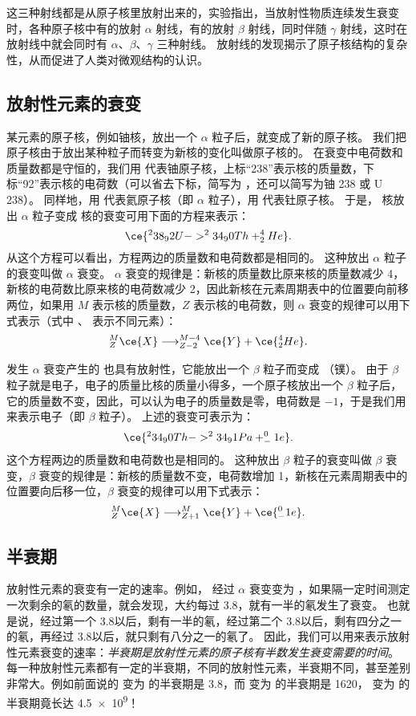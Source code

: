 这三种射线都是从原子核里放射出来的，实验指出，当放射性物质连续发生衰变时，各种原子核中有的放射 $\alpha$ 射线，有的放射 $\beta$ 射线，同时伴随 $\gamma$ 射线，这时在放射线中就会同时有 $\alpha$、$\beta$、$\gamma$ 三种射线。
放射线的发现揭示了原子核结构的复杂性，从而促进了人类对微观结构的认识。

\subsection{放射性元素的衰变}

某元素的原子核，例如铀核，放出一个 $\alpha$ 粒子后，就变成了新的原子核。
我们把原子核由于放出某种粒子而转变为新核的变化叫做原子核的。
在衰变中电荷数和质量数都是守恒的，我们用  代表铀原子核，上标“238”表示核的质量数，下标“92”表示核的电荷数（可以省去下标，简写为 ，还可以简写为铀 238 或 U\,238）。
同样地，用  代表氦原子核（即 $\alpha$ 粒子），用  代表钍原子核。
于是， 核放出 $\alpha$ 粒子变成  核的衰变可用下面的方程来表示：
\[ \ce{^238_92U -> ^234_90Th + ^4_2He}. \]
从这个方程可以看出，方程两边的质量数和电荷数都是相同的。
这种放出 $\alpha$ 粒子的衰变叫做 $\alpha$ 衰变。
$\alpha$ 衰变的规律是：新核的质量数比原来核的质量数减少 4，新核的电荷数比原来核的电荷数减少 2，因此新核在元素周期表中的位置要向前移两位，如果用 $M$ 表示核的质量数，$Z$ 表示核的电荷数，则 $\alpha$ 衰变的规律可以用下式表示（式中 、 表示不同元素）：
\[ ^{M}_{Z}\ce{X} \longrightarrow ^{M-4}_{Z-2}\ce{Y}+ \ce{^4_2He}.\]

 发生 $\alpha$ 衰变产生的  也具有放射性，它能放出一个 $\beta$ 粒子而变成 （镤）。
由于 $\beta$ 粒子就是电子，电子的质量比核的质量小得多，一个原子核放出一个 $\beta$ 粒子后，它的质量数不变，因此，可以认为电子的质量数是零，电荷数是 $-1$，于是我们用  来表示电子（即 $\beta$ 粒子）。
上述的衰变可表示为：
\[ \ce{ ^234_90Th -> ^234_91Pa + ^0_-1e}.\]
这个方程两边的质量数和电荷数也是相同的。
这种放出 $\beta$ 粒子的衰变叫做 $\beta$ 衰变，$\beta$ 衰变的规律是：新核的质量数不变，电荷数增加 1，新核在元素周期表中的位置要向后移一位，$\beta$ 衰变的规律可以用下式表示：
\[  ^{M}_{Z}\ce{X} \longrightarrow ^{M}_{Z+1}\ce{Y}+ \ce{^0_-1e}.\]

\subsection{半衰期}
放射性元素的衰变有一定的速率。例如， 经过 $\alpha$ 衰变变为 ，如果隔一定时间测定一次剩余的氡的数量，就会发现，大约每过 \qty{3.8}{}，就有一半的氡发生了衰变。
也就是说，经过第一个 \qty{3.8}{}以后，剩有一半的氡，经过第二个 \qty{3.8}{}以后，剩有四分之一的氡，再经过 \qty{3.8}{}以后，就只剩有八分之一的氡了。
因此，我们可以用来表示放射性元素衰变的速率：\emph{半衰期是放射性元素的原子核有半数发生衰变需要的时间}。
每一种放射性元素都有一定的半衰期，不同的放射性元素，半衰期不同，甚至差别非常大。例如前面说的   变为  的半衰期是 \qty{3.8}{}，而  变为  的半衰期是 \qty{1620}{}， 变为  的半衰期竟长达 \qty{4.5e9}{}！


